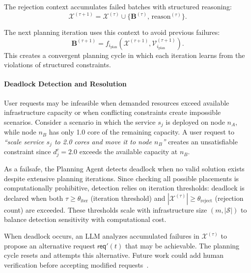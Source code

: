 The rejection context accumulates failed batches with structured reasoning:
\begin{equation}
\mathcal{X}^{(\tau+1)} = \mathcal{X}^{(\tau)} \cup \{\mathbf{B}^{(\tau)},\, \text{reason}^{(\tau)}\}.
\label{eq:ch5_rejection_context}
\end{equation}

The next planning iteration uses this context to avoid previous failures:
\begin{equation}
\mathbf{B}^{(\tau+1)} = f_{i_{\text{plan}}}(\mathcal{X}^{(\tau+1)}, \mathcal{V}_{i_{\text{plan}}}^{(\tau+1)}).
\label{eq:ch5_iterative_planning}
\end{equation}
This creates a convergent planning cycle in which each iteration learns from the violations of structured constraints.

\paragraph{Deadlock Detection and Resolution}

User requests may be infeasible when demanded resources exceed available infrastructure capacity or when conflicting constraints create impossible scenarios. Consider a scenario in which the service $s_j$ is deployed on node $n_A$, while node $n_B$ has only 1.0 core of the remaining capacity. A user request to \textit{``scale service $s_j$ to 2.0 cores and move it to node $n_B$''} creates an unsatisfiable constraint since $d_j^c = 2.0$ exceeds the available capacity at $n_B$. 

As a failsafe, the Planning Agent detects deadlock when no valid solution exists despite extensive planning iterations. Since checking all possible placements is computationally prohibitive, detection relies on iteration thresholds: deadlock is declared when both $\tau \geq \theta_{\text{iter}}$ (iteration threshold) and $|\mathcal{X}^{(\tau)}| \geq \theta_{\text{reject}}$ (rejection count) are exceeded. These thresholds scale with infrastructure size $(m, |\mathcal{S}|)$ to balance detection sensitivity with computational cost.

When deadlock occurs, an \ac{LLM} analyzes accumulated failures in $\mathcal{X}^{(\tau)}$ to propose an alternative request $\mathsf{req}'(t)$ that may be achievable. The planning cycle resets and attempts this alternative. Future work could add human verification before accepting modified requests~\cite{human_loop_2025}.

